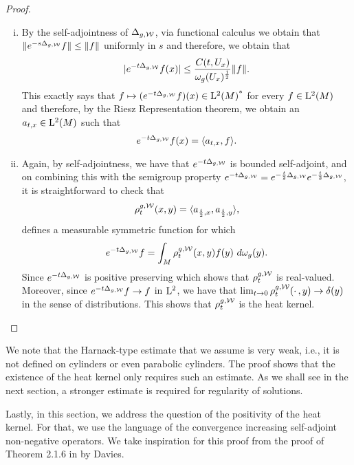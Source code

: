 \documentclass[a4paper, 12pt]{amsart}
\begin{document}
\begin{proof}
\begin{enumerate}[(i)]
\item By the self-adjointness of $\Delta_{g,\mathcal{W}}$, via functional calculus 
	we obtain that $\| e^{-s\Delta_{g,\mathcal{W}}}f \| \leq \| f \|$
	uniformly in $s$  and therefore, we obtain that
	$$|e^{-t \Delta_{g,\mathcal{W}}}f(x)| \leq 
		\frac{C(t,U_x)}{\omega_g(U_x)^{\frac{1}{2}}} \| f \|.$$
	This exactly says that $f \mapsto (e^{-t\Delta_{g,\mathcal{W}}}f)(x) \in {{\rm L}^{2}_{\rm {}}(M)}^\ast$
	for every $f \in {\rm L}^{2}_{\rm {}}(M)$ and therefore, by the Riesz Representation theorem,
	we obtain an $a_{t,x} \in {\rm L}^{2}_{\rm {}}(M)$ such that
	$$ e^{-t \Delta_{g,\mathcal{W}}}f(x) = \langle a_{t,x},f \rangle.$$

\item Again, by self-adjointness, we have that $e^{-t \Delta_{g,\mathcal{W}}}$
	is bounded self-adjoint, and
	on combining this with the semigroup property 
	$e^{-t\Delta_{g,\mathcal{W}}} = e^{-\frac{t}{2} \Delta_{g,\mathcal{W}}}e^{-\frac{t}{2} \Delta_{g,\mathcal{W}}}$, 
	it is straightforward to check that 
		$$\rho^{g,\mathcal{W}}_t(x,y) = \langle a_{\frac{t}{2}, x}, a_{\frac{t}{2}, y} \rangle,$$
	defines a measurable symmetric function for which 
	$$e^{-t \Delta_{g,\mathcal{W}}}f = \int_{M} \rho^{g,\mathcal{W}}_t(x,y)f(y)\ d\omega_g(y).$$
	Since $e^{-t \Delta_{g,\mathcal{W}}}$
	is positive preserving which shows that $\rho_t^{g,\mathcal{W}}$
	is real-valued. Moreover, since $e^{-t\Delta_{g,\mathcal{W}}}f \to f$
	in ${\rm L}^{2}_{\rm {}}$, we have that 
	$\lim_{t \to 0} \rho^{g,\mathcal{W}}_t(\cdotp,y) \to  \delta(y)$
	in the sense of distributions. This
	shows that $\rho^{g,\mathcal{W}}_t$ is the heat kernel.
\end{enumerate} 
\end{proof}

\begin{rem}
We note that the Harnack-type estimate that we assume is very 
weak, i.e., it is not defined on cylinders or even 
parabolic cylinders. The proof shows that the existence 
of the heat kernel only requires such an estimate. 
As we shall see in the next section, a stronger
estimate is required for regularity of solutions. 
\end{rem}

Lastly, in this section, we address the question of 
the positivity of the heat kernel. For that, 
we use the language of the convergence 
increasing self-adjoint non-negative operators.
We take inspiration for this proof
from the proof of Theorem 2.1.6 in \cite{Davies}
by Davies. 
\end{document}
